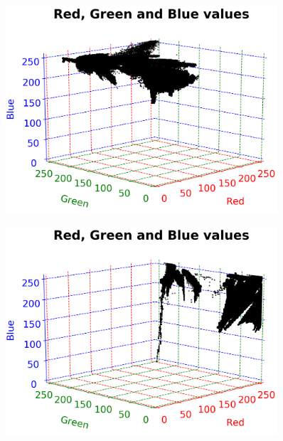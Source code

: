 \vspace{1mm}

\begin{figure}[h!]
	\centering
	\begin{minipage}{0.5\textwidth}
		\centering
		\includegraphics[width=0.9\textwidth]{img/rgbBlue.png}
		\captionsetup{width=0.9\textwidth}
		\label{rgbBluePlot}
	\end{minipage}%
	\begin{minipage}{0.5\textwidth}
		\centering
		\includegraphics[width=0.9\textwidth]{img/rgbPink.png}
		\captionsetup{width=0.9\textwidth}
		\label{rgbPinkPlot}
	\end{minipage}
\end{figure}

